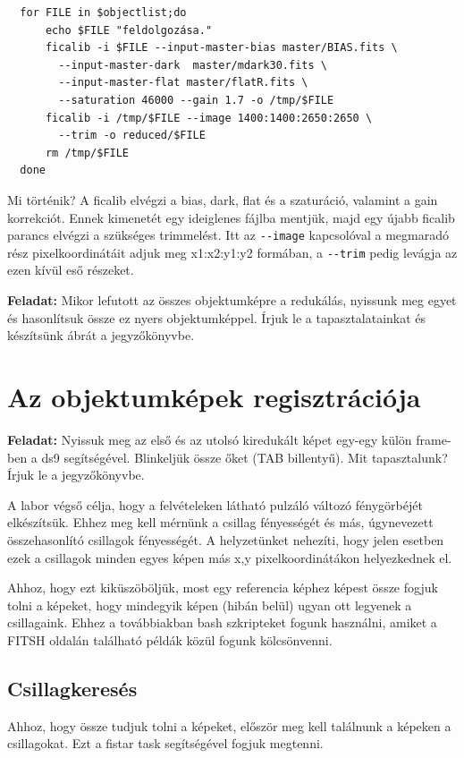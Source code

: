 \documentclass{article}
\begin{document}
\begin{verbatim}
  for FILE in $objectlist;do
      echo $FILE "feldolgozása."
      ficalib -i $FILE --input-master-bias master/BIAS.fits \
        --input-master-dark  master/mdark30.fits \
        --input-master-flat master/flatR.fits \
        --saturation 46000 --gain 1.7 -o /tmp/$FILE
      ficalib -i /tmp/$FILE --image 1400:1400:2650:2650 \
        --trim -o reduced/$FILE
      rm /tmp/$FILE
  done
\end{verbatim}

Mi történik? A ficalib elvégzi a bias, dark, flat és a szaturáció, valamint a
gain korrekciót. Ennek kimenetét egy ideiglenes fájlba mentjük, majd egy újabb
ficalib parancs elvégzi a szükséges trimmelést. Itt az \verb+--image+ kapcsolóval a
megmaradó rész pixelkoordinátáit adjuk meg x1:x2:y1:y2 formában, a \verb+--trim+ pedig
levágja az  ezen kívül eső részeket.

{\bf Feladat:}
Mikor lefutott az összes objektumképre a redukálás, nyissunk meg egyet és
hasonlítsuk össze ez nyers objektumképpel. Írjuk le a tapasztalatainkat és
készítsünk ábrát a jegyzőkönyvbe.

\section{Az objektumképek regisztrációja}

{\bf Feladat:}
Nyissuk meg az első és az utolsó kiredukált képet egy-egy külön frame-ben a ds9
segítségével. Blinkeljük össze őket (TAB billentyű). Mit tapasztalunk? Írjuk le
a jegyzőkönyvbe.

A labor végső célja, hogy a felvételeken látható pulzáló változó fénygörbéjét
elkészítsük. Ehhez meg kell mérnünk a csillag fényességét és más, úgynevezett
összehasonlító csillagok fényességét. A helyzetünket nehezíti, hogy jelen
esetben ezek a csillagok minden egyes képen más x,y pixelkoordinátákon
helyezkednek el.

Ahhoz, hogy ezt kiküszöböljük, most egy referencia képhez képest össze fogjuk
tolni a képeket, hogy mindegyik képen (hibán belül) ugyan ott legyenek a
csillagaink. Ehhez a továbbiakban bash szkripteket fogunk használni, amiket a
FITSH oldalán található példák közül fogunk kölcsönvenni.

\subsection{Csillagkeresés}

Ahhoz, hogy össze tudjuk tolni a képeket, először meg kell találnunk a képeken a
csillagokat. Ezt a fistar task segítségével fogjuk megtenni.
\end{document}
